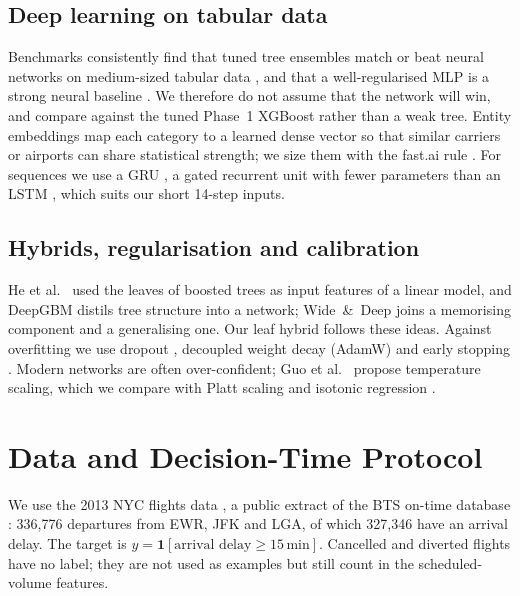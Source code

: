 \documentclass[conference]{IEEEtran}
\begin{document}
\subsection{Deep learning on tabular data}
Benchmarks consistently find that tuned tree ensembles match or beat neural networks on
medium-sized tabular data \cite{grinsztajn2022,shwartz2022}, and that a well-regularised
MLP is a strong neural baseline \cite{gorishniy2021}. We therefore do not assume that the
network will win, and compare against the tuned Phase~1 XGBoost rather than a weak tree.
Entity embeddings \cite{guo2016entity} map each category to a learned dense vector so
that similar carriers or airports can share statistical strength; we size them with the
fast.ai rule \cite{howard2020fastai}. For sequences we use a GRU
\cite{cho2014gru}, a gated recurrent unit with fewer parameters than an LSTM
\cite{hochreiter1997}, which suits our short 14-step inputs.

\subsection{Hybrids, regularisation and calibration}
He et al.~\cite{he2014facebook} used the leaves of boosted trees as input features of a
linear model, and DeepGBM \cite{ke2019deepgbm} distils tree structure into a network;
Wide~\&~Deep \cite{cheng2016wide} joins a memorising component and a generalising one.
Our leaf hybrid follows these ideas. Against overfitting we use dropout
\cite{srivastava2014dropout}, decoupled weight decay (AdamW)
\cite{kingma2015adam,loshchilov2019adamw} and early stopping \cite{prechelt1998}.
Modern networks are often over-confident; Guo et al.~\cite{guo2017calibration} propose
temperature scaling, which we compare with Platt scaling \cite{platt1999} and isotonic
regression \cite{zadrozny2002}.

\section{Data and Decision-Time Protocol}
We use the 2013 NYC flights data \cite{nycflights13}, a public extract of the BTS
on-time database \cite{bts_ontime}: 336{,}776 departures from EWR, JFK and LGA, of
which 327{,}346 have an arrival delay. The target is $y=\mathbf{1}[\text{arrival delay}
\ge 15\,\text{min}]$. Cancelled and diverted flights have no label; they are not used as
examples but still count in the scheduled-volume features.
\end{document}

